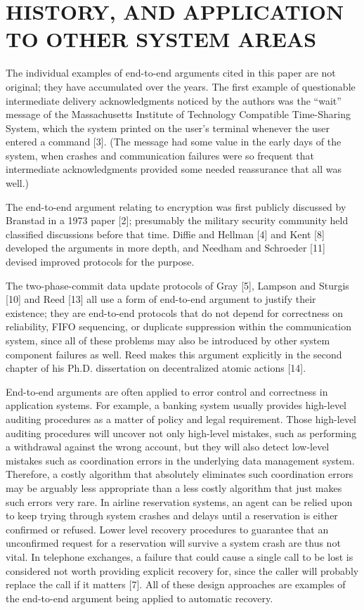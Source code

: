 \documentclass[a4paper,12pt,notitlepage,twoside,openright]{article}
\begin{document}
\hypertarget{history-and-application-to-other-system-areas}{%
\section{HISTORY, AND APPLICATION TO OTHER SYSTEM
AREAS}\label{history-and-application-to-other-system-areas}}


The individual examples of end-to-end arguments cited in this paper are
not original; they have accumulated over the years. The first example of
questionable intermediate delivery acknowledgments noticed by the
authors was the ``wait'' message of the Massachusetts Institute of
Technology Compatible Time-Sharing System, which the system printed on
the user's terminal whenever the user entered a command {[}3{]}. (The
message had some value in the early days of the system, when crashes and
communication failures were so frequent that intermediate
acknowledgments provided some needed reassurance that all was well.)


The end-to-end argument relating to encryption was first publicly
discussed by Branstad in a 1973 paper {[}2{]}; presumably the military
security community held classified discussions before that time. Diffie
and Hellman {[}4{]} and Kent {[}8{]} developed the arguments in more
depth, and Needham and Schroeder {[}11{]} devised improved protocols for
the purpose.


The two-phase-commit data update protocols of Gray {[}5{]}, Lampson and
Sturgis {[}10{]} and Reed {[}13{]} all use a form of end-to-end argument to justify
their existence; they are end-to-end protocols that do not depend for
correctness on reliability, FIFO sequencing, or duplicate suppression
within the communication system, since all of these problems may also
be introduced by other system component failures as well. Reed makes
this argument explicitly in the second chapter of his Ph.D.
dissertation on decentralized atomic actions {[}14{]}.

End-to-end arguments are often applied to error control and correctness
in application systems. For example, a banking system usually provides
high-level auditing procedures as a matter of policy and legal
requirement. Those high-level auditing procedures will uncover not only
high-level mistakes, such as performing a withdrawal against the wrong
account, but they will also detect low-level mistakes such as
coordination errors in the underlying data management system. Therefore,
a costly algorithm that absolutely eliminates such coordination errors
may be arguably less appropriate than a less costly algorithm that just
makes such errors very rare. In airline reservation systems, an agent
can be relied upon to keep trying through system crashes and delays
until a reservation is either confirmed or refused. Lower level recovery
procedures to guarantee that an unconfirmed request for a reservation
will survive a system crash are thus not vital. In telephone exchanges,
a failure that could cause a single call to be lost is considered not
worth providing explicit recovery for, since the caller will probably
replace the call if it matters {[}7{]}. All of these design approaches
are examples of the end-to-end argument being applied to automatic
recovery.
\end{document}
